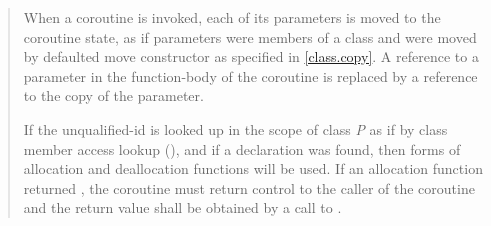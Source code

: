 \begin{quote}
\pnum
When a coroutine is invoked, each of its parameters is moved to the coroutine state, as if parameters were members of a class and were moved by defaulted move constructor as specified in \ref{class.copy}.  
A reference to a parameter in the function-body of the coroutine is replaced by a reference to the copy of the parameter.

%
%






\pnum
If the unqualified-id  is looked up in the scope of class \textit{P}
as if by class member access lookup (), and if a declaration was found,
 then  forms of allocation and deallocation functions will be used. If an allocation function returned , the coroutine must return control to the caller of the coroutine and the return value shall be obtained by a call to .


\end{quote}
